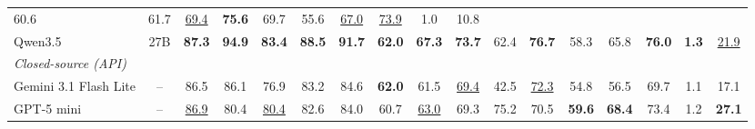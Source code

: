 \begin{tabular}{lcccccccccccccccc}
   60.6 & \cellcolor[rgb]{0.760,0.631,0.733} 61.7 & \cellcolor[rgb]{0.718,0.605,0.712} \underline{69.4} &
  \cellcolor[rgb]{0.681,0.584,0.690} \textbf{75.6} & \cellcolor[rgb]{0.715,0.603,0.710} 69.7 & \cellcolor[rgb]{0.788,0.651,0.746} 55.6 &
  \cellcolor[rgb]{0.730,0.612,0.718} \underline{67.0} & \cellcolor[rgb]{0.690,0.589,0.696} \underline{73.9} &
  \cellcolor[rgb]{0.877,0.736,0.789} 1.0 & \cellcolor[rgb]{0.942,0.849,0.849} 10.8 \\
  Qwen3.5 & 27B & \cellcolor[rgb]{0.614,0.550,0.644} \textbf{87.3} & \cellcolor[rgb]{0.573,0.529,0.610} \textbf{94.9} &
  \cellcolor[rgb]{0.636,0.561,0.661} \textbf{83.4} & \cellcolor[rgb]{0.608,0.547,0.639} \textbf{88.5} & \cellcolor[rgb]{0.592,0.539,0.626}
  \textbf{91.7} & \cellcolor[rgb]{0.757,0.629,0.732} \textbf{62.0} & \cellcolor[rgb]{0.727,0.610,0.717} \textbf{67.3} &
  \cellcolor[rgb]{0.693,0.591,0.698} \textbf{73.7} & \cellcolor[rgb]{0.754,0.627,0.730} 62.4 & \cellcolor[rgb]{0.674,0.581,0.686}
  \textbf{76.7} & \cellcolor[rgb]{0.774,0.641,0.740} 58.3 & \cellcolor[rgb]{0.736,0.616,0.721} 65.8 & \cellcolor[rgb]{0.681,0.584,0.690}
  \textbf{76.0} & \cellcolor[rgb]{0.850,0.705,0.775} \textbf{1.3} & \cellcolor[rgb]{0.916,0.795,0.817} \underline{21.9} \\
  \midrule
  \multicolumn{17}{l}{\textit{Closed-source (API)}} \\
  \midrule
  Gemini 3.1 Flash Lite & -- & \cellcolor[rgb]{0.620,0.553,0.649} 86.5 & \cellcolor[rgb]{0.620,0.553,0.649} 86.1 &
  \cellcolor[rgb]{0.674,0.581,0.686} 76.9 & \cellcolor[rgb]{0.639,0.563,0.663} 83.2 & \cellcolor[rgb]{0.630,0.558,0.656} 84.6 &
  \cellcolor[rgb]{0.757,0.629,0.732} \textbf{62.0} & \cellcolor[rgb]{0.760,0.631,0.733} 61.5 & \cellcolor[rgb]{0.718,0.605,0.712}
  \underline{69.4} & \cellcolor[rgb]{0.848,0.703,0.773} 42.5 & \cellcolor[rgb]{0.703,0.596,0.703} \underline{72.3} &
  \cellcolor[rgb]{0.794,0.655,0.749} 54.8 & \cellcolor[rgb]{0.785,0.649,0.745} 56.5 & \cellcolor[rgb]{0.715,0.603,0.710} 69.7 &
  \cellcolor[rgb]{0.867,0.724,0.783} 1.1 & \cellcolor[rgb]{0.929,0.819,0.831} 17.1 \\
  GPT-5 mini & -- & \cellcolor[rgb]{0.617,0.551,0.647} \underline{86.9} & \cellcolor[rgb]{0.655,0.571,0.674} 80.4 &
  \cellcolor[rgb]{0.655,0.571,0.674} \underline{80.4} & \cellcolor[rgb]{0.642,0.564,0.665} 82.6 & \cellcolor[rgb]{0.633,0.559,0.659} 84.0 &
   \cellcolor[rgb]{0.763,0.633,0.734} 60.7 & \cellcolor[rgb]{0.751,0.625,0.729} \underline{63.0} & \cellcolor[rgb]{0.718,0.605,0.712} 69.3
  & \cellcolor[rgb]{0.684,0.586,0.692} 75.2 & \cellcolor[rgb]{0.712,0.601,0.708} 70.5 & \cellcolor[rgb]{0.769,0.637,0.737} \textbf{59.6} &
  \cellcolor[rgb]{0.721,0.607,0.713} \textbf{68.4} & \cellcolor[rgb]{0.696,0.593,0.700} 73.4 & \cellcolor[rgb]{0.861,0.717,0.780} 1.2 &
  \cellcolor[rgb]{0.902,0.771,0.805} \textbf{27.1} \\
  \bottomrule
  \end{tabular}